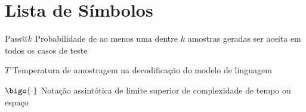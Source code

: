 \chapter*{Lista de Símbolos}

\begin{description}
    \item $\mathrm{Pass@}k$ \quad Probabilidade de ao menos uma dentre $k$ amostras geradas ser aceita em todos os casos de teste
    \item $T$ \quad Temperatura de amostragem na decodificação do modelo de linguagem
    \item $\bigo{\cdot}$ \quad Notação assintótica de limite superior de complexidade de tempo ou espaço
\end{description}
